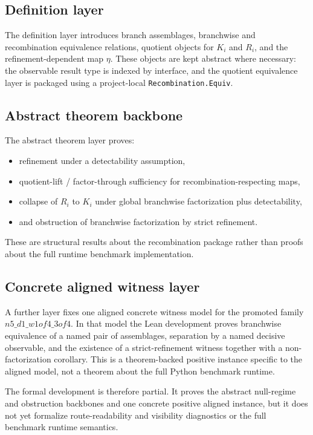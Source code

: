 \documentclass[11pt]{article}
\theoremstyle{definition}
\begin{document}
\subsection{Definition layer}

The definition layer introduces branch assemblages, branchwise and recombination equivalence relations, quotient objects for \(K_i\) and \(R_i\), and the refinement-dependent map \(\eta\). These objects are kept abstract where necessary: the observable result type is indexed by interface, and the quotient equivalence layer is packaged using a project-local \texttt{Recombination.Equiv}.

\subsection{Abstract theorem backbone}

The abstract theorem layer proves:
\begin{itemize}
\item refinement under a detectability assumption,
\item quotient-lift / factor-through sufficiency for recombination-respecting maps,
\item collapse of \(R_i\) to \(K_i\) under global branchwise factorization plus detectability,
\item and obstruction of branchwise factorization by strict refinement.
\end{itemize}
These are structural results about the recombination package rather than proofs about the full runtime benchmark implementation.

\subsection{Concrete aligned witness layer}

A further layer fixes one aligned concrete witness model for the promoted family \(n5\_d1\_w1of4\_3of4\). In that model the Lean development proves branchwise equivalence of a named pair of assemblages, separation by a named decisive observable, and the existence of a strict-refinement witness together with a non-factorization corollary. This is a theorem-backed positive instance specific to the aligned model, not a theorem about the full Python benchmark runtime.

The formal development is therefore partial. It proves the abstract null-regime and obstruction backbones and one concrete positive aligned instance, but it does not yet formalize route-readability and visibility diagnostics or the full benchmark runtime semantics.
\end{document}

